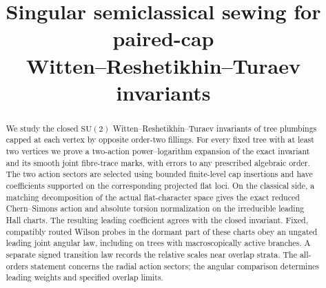 \documentclass[11pt]{article}
\title{Singular semiclassical sewing for paired-cap\\Witten--Reshetikhin--Turaev invariants}
\author{}
\date{}
\theoremstyle{definition}
\theoremstyle{remark}
\begin{document}
\maketitle
\begin{abstract}
We study the closed \(\mathrm{SU}(2)\) Witten--Reshetikhin--Turaev invariants of tree plumbings capped at each vertex by opposite order-two fillings. For every fixed tree with at least two vertices we prove a two-action power--logarithm expansion of the exact invariant and its smooth joint fibre-trace marks, with errors to any prescribed algebraic order. The two action sectors are selected using bounded finite-level cap insertions and have coefficients supported on the corresponding projected flat loci. On the classical side, a matching decomposition of the actual flat-character space gives the exact reduced Chern--Simons action and absolute torsion normalization on the irreducible leading Hall charts. The resulting leading coefficient agrees with the closed invariant. Fixed, compatibly routed Wilson probes in the dormant part of these charts obey an ungated leading joint angular law, including on trees with macroscopically active branches. A separate signed transition law records the relative scales near overlap strata. The all-orders statement concerns the radial action sectors; the angular comparison determines leading weights and specified overlap limits.
\end{abstract}
\tableofcontents









\end{document}

